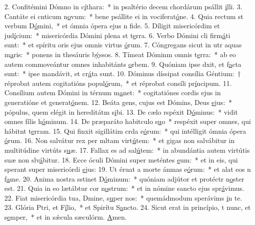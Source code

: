 2. Confitémini Dómno in c\uline{í}thara:~* in psaltério decem chordárum psállit \uline{i}lli.
3. Cantáte ei cnticum n\uline{o}vum:~* bene psállite ei in vociferat\uline{ó}ne.
4. Quia rectum st verbum D\uline{ó}mini,~* et ómnia ópera ejus n f\uline{i}de.
5. Díligit misericórdim et jud\uline{í}cium:~* misericórdia Dómini plena st t\uline{e}rra.
6. Verbo Dómini cli firm\uline{á}ti sunt:~* et spíritu oris ejus omnis virtus \uline{ó}rum.
7. Cóngregans sicut in utr aquas m\uline{a}ris:~* ponens in thesáuris b\uline{ý}ssos.
8. Tímeat Dóminm omnis t\uline{e}rra:~* ab eo autem commoveántur omnes inhabitánts \uline{o}rbem.
9. Quóniam ipse dxit, et f\uline{a}cta sunt:~* ipse mandávit, et cr\uline{á}ta sunt.
10. Dóminus díssipat consília Géntium:~† réprobat autem cogitatións popul\uline{ó}rum,~* et réprobat consíli pr\uline{í}ncipum.
11. Consílium autem Dómini in térnum m\uline{a}net:~* cogitatiónes cordis ejus in generatióne et generat\uline{ó}nem.
12. Beáta gens, cujus est Dómins, Deus \uline{e}jus:~* pópulus, quem elégit in hereditátm s\uline{i}bi.
13. De cælo rspéxit D\uline{ó}minus:~* vidit omnes fílis h\uline{ó}minum.
14. De præparáto habitculo s\uline{u}o~* respéxit super omnes, qui hábitnt t\uline{e}rram.
15. Qui finxit sigillátim crda e\uline{ó}rum:~* qui intélligit ómnia ópera \uline{ó}rum.
16. Non salvátur rex per mltam virt\uline{ú}tem:~* et gigas non salvábitur in multitúdine virtúts s\uline{u}æ.
17. Fallax es ad sal\uline{ú}tem:~* in abundántia autem virtútis suæ non slv\uline{á}bitur.
18. Ecce óculi Dómini super meténtes \uline{e}um:~* et in eis, qui sperant super misericórdi \uline{e}jus:
19. Ut éruat a morte ánmas e\uline{ó}rum:~* et alat eos n f\uline{a}me.
20. Anima nostra sstinet D\uline{ó}minum:~* quóniam adjútor et protéctr n\uline{o}ster est.
21. Quia in eo lætábtur cor n\uline{o}strum:~* et in nómine sancto ejus spr\uline{á}vimus.
22. Fiat misericórdia tua, Dmine, s\uline{u}per nos:~* quemádmodum sperávims \uline{i}n te.
23. Glória Ptri, et F\uline{í}lio,~* et Spirítu S\uline{a}ncto.
24. Sicut erat in princípio, t nunc, et s\uline{e}mper,~* et in sǽcula sæculórm. \uline{A}men.
